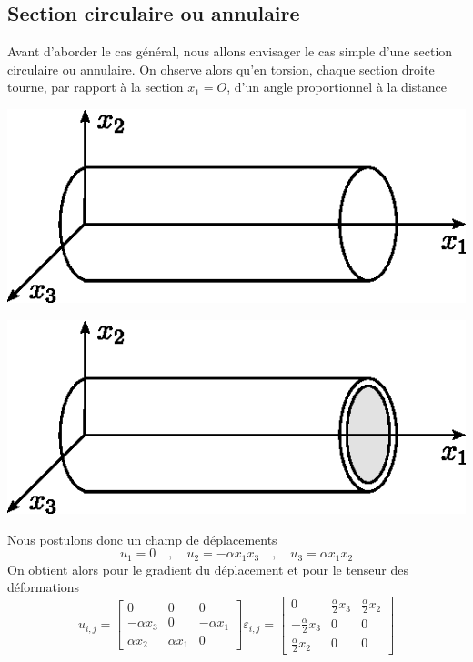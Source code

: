 \subsection{Section circulaire ou annulaire} \label{ssec:Ch07-2.1}
Avant d'aborder le cas général, nous allons envisager le cas simple d'une section circulaire ou annulaire.
On ohserve alors qu'en torsion, chaque section droite tourne, par rapport à la section $x_1=O$, d'un angle proportionnel à la distance
\begin{multicols}{2}
    \begin{center}
        \includegraphics{../images/T1_Ch07-09}
    \end{center}
    \begin{center}
        \includegraphics{../images/T1_Ch07-10}
    \end{center}
\end{multicols}
Nous postulons donc un champ de déplacements
\begin{equation}
    u_1 = 0 \quad,\quad u_2 = -\alpha x_1 x_3 \quad,\quad u_3 = \alpha x_1 x_2
    \label{eq:Ch07-037}
\end{equation}
On obtient alors pour le gradient du déplacement et pour le tenseur des déformations
\begin{equation}
    u_{i,j} = 
    \begin{bmatrix}
        0 & 0 & 0 \\
        -\alpha x_3 & 0 & -\alpha x_1 \\
        \alpha x_2 & \alpha x_1 & 0
    \end{bmatrix}
    \varepsilon_{i,j} = 
    \begin{bmatrix}
        0 & \frac{\alpha}{2}x_3 & \frac{\alpha}{2}x_2 \\
        -\frac{\alpha}{2}x_3 & 0 & 0 \\
        \frac{\alpha}{2}x_2 & 0 & 0
    \end{bmatrix}
    \label{eq:Ch07-038}
\end{equation}
